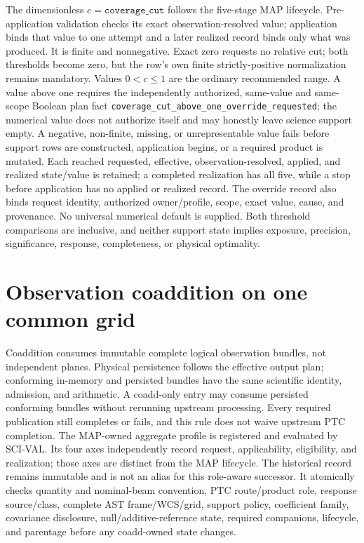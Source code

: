 \documentclass[10pt]{article}
\newcommand{\code}[1]{\nolinkurl{#1}}
\begin{document}
The dimensionless \(c=\texttt{coverage\_cut}\) follows the five-stage MAP
lifecycle. Pre-application validation checks its exact observation-resolved
value; application binds that value to one attempt and a later realized record
binds only what was produced. It is finite and nonnegative.
Exact zero requests no relative cut; both thresholds become zero, but the
row's own finite strictly-positive normalization remains mandatory. Values
\(0<c\le1\) are the ordinary recommended range. A value above one requires the
independently authorized, same-value and same-scope Boolean plan fact
\code{coverage_cut_above_one_override_requested}; the numerical value does not
authorize itself and may honestly leave science support empty. A
negative, non-finite, missing, or unrepresentable value fails before support
rows are constructed, application begins, or a required product is mutated.
Each reached requested, effective, observation-resolved, applied, and realized
state/value is retained; a completed realization has all five, while a stop
before application has no applied or realized record. The override record also
binds request identity, authorized owner/profile, scope, exact value, cause,
and provenance. No
universal numerical default is supplied. Both threshold comparisons are
inclusive, and neither support state implies exposure, precision,
significance, response, completeness, or physical optimality.

\clearpage
\section{Observation coaddition on one common grid}

Coaddition consumes immutable complete logical observation bundles, not
independent planes. Physical persistence follows the effective output plan;
conforming in-memory and persisted bundles have the same scientific identity,
admission, and arithmetic. A coadd-only entry may consume persisted conforming
bundles without rerunning upstream processing. Every required publication
still completes or fails, and this rule does not waive upstream PTC completion.
The MAP-owned aggregate profile
\SCIMapCoaddProfile{} is registered and evaluated by
SCI-VAL. Its four axes independently record request, applicability,
eligibility, and realization; those axes are distinct from the MAP lifecycle.
The historical \SCIMapCoaddProfileHistorical{} record remains immutable and
is not an alias for this role-aware successor. It atomically checks quantity
and nominal-beam convention, PTC route/product role, response source/class,
complete AST frame/WCS/grid, support policy, coefficient family, covariance
disclosure, null/additive-reference state, required companions, lifecycle,
and parentage before any coadd-owned state changes.
\end{document}
